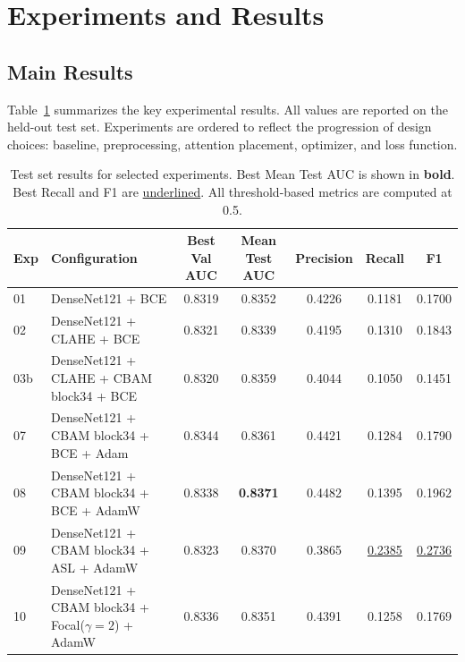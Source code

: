 \section{Experiments and Results}

\subsection{Main Results}

Table~\ref{tab:main_results} summarizes the key experimental results.
All values are reported on the held-out test set.
Experiments are ordered to reflect the progression of design choices: baseline, preprocessing, attention placement, optimizer, and loss function.

\begin{table}[ht]
\centering
\caption{Test set results for selected experiments. Best Mean Test AUC is shown in \textbf{bold}. Best Recall and F1 are \underline{underlined}. All threshold-based metrics are computed at 0.5.}
\label{tab:main_results}
\setlength{\tabcolsep}{5pt}
\begin{tabular}{llccccc}
\toprule
\textbf{Exp} & \textbf{Configuration} & \textbf{Best Val AUC} & \textbf{Mean Test AUC} & \textbf{Precision} & \textbf{Recall} & \textbf{F1} \\
\midrule
01 & DenseNet121 + BCE                              & 0.8319 & 0.8352          & 0.4226 & 0.1181          & 0.1700          \\
02 & DenseNet121 + CLAHE + BCE                      & 0.8321 & 0.8339          & 0.4195 & 0.1310          & 0.1843          \\
03b & DenseNet121 + CLAHE + CBAM block34 + BCE       & 0.8320 & 0.8359          & 0.4044 & 0.1050          & 0.1451          \\
07 & DenseNet121 + CBAM block34 + BCE + Adam        & 0.8344 & 0.8361          & 0.4421 & 0.1284          & 0.1790          \\
08 & DenseNet121 + CBAM block34 + BCE + AdamW       & 0.8338 & \textbf{0.8371} & 0.4482 & 0.1395          & 0.1962          \\
09 & DenseNet121 + CBAM block34 + ASL + AdamW       & 0.8323 & 0.8370          & 0.3865 & \underline{0.2385} & \underline{0.2736} \\
10 & DenseNet121 + CBAM block34 + Focal($\gamma{=}2$) + AdamW & 0.8336 & 0.8351 & 0.4391 & 0.1258          & 0.1769          \\
\bottomrule
\end{tabular}
\end{table}

